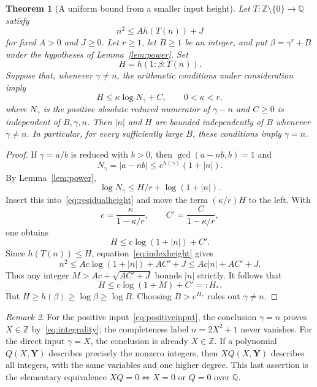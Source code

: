 \documentclass[11pt,a4paper]{article}
\newtheorem{theorem}{Theorem}[section]
\theoremstyle{remark}\newtheorem{remark}[theorem]{Remark}
\newcommand{\Q}{\mathbb Q}\newcommand{\Z}{\mathbb Z}
\begin{document}
\begin{theorem}[A uniform bound from a smaller input height]
\label{thm:absorption}
Let $T:\Z\setminus\{0\}\to\Q$ satisfy
\begin{equation}\label{eq:indexheight}
                  n^2\le A h(T(n))+J
\end{equation}
for fixed $A>0$ and $J\ge0$. Let $r\ge1$, let $B\ge1$ be
an integer, and put $\beta=\gamma^r+B$ under the hypotheses
of Lemma~\ref{lem:power}. Set
\[
                      H=h(1:\beta:T(n)).
\]
Suppose that, whenever $\gamma\ne n$, the arithmetic conditions
under consideration imply
\begin{equation}\label{eq:residualheight}
               H\le\kappa\log N_\gamma+C,
               \qquad 0<\kappa<r,
\end{equation}
where $N_\gamma$ is the positive absolute reduced numerator of
$\gamma-n$ and $C\ge0$ is independent of $B,\gamma,n$.
Then $|n|$ and $H$ are bounded independently of $B$ whenever
$\gamma\ne n$. In particular, for every sufficiently large $B$,
these conditions imply $\gamma=n$.
\end{theorem}
\begin{proof}
If $\gamma=a/b$ is reduced with $b>0$, then
$\gcd(a-nb,b)=1$ and
\[
 N_\gamma=|a-nb|\le e^{h(\gamma)}(1+|n|).
\]
By Lemma~\ref{lem:power},
\[
                  \log N_\gamma\le H/r+\log(1+|n|).
\]
Insert this into~\eqref{eq:residualheight} and move the term
$(\kappa/r)H$ to the left. With
\[
 c=\frac{\kappa}{1-\kappa/r},\qquad
 C'=\frac{C}{1-\kappa/r},
\]
one obtains
\begin{equation}\label{eq:absorbed}
                         H\le c\log(1+|n|)+C'.
\end{equation}
Since $h(T(n))\le H$, equation~\eqref{eq:indexheight} gives
\[
 n^2\le Ac\log(1+|n|)+AC'+J\le Ac|n|+AC'+J.
\]
Thus any integer $M>Ac+\sqrt{AC'+J}$ bounds $|n|$ strictly.
It follows that
\[
 H\le c\log(1+M)+C'=:H_*.
\]
But $H\ge h(\beta)\ge\log\beta\ge\log B$.
Choosing $B>e^{H_*}$ rules out $\gamma\ne n$.
\end{proof}

\begin{remark}
For the positive input~\eqref{eq:positiveinput}, the conclusion
$\gamma=n$ proves $X\in\Z$ by~\eqref{eq:integrality}; the
completeness label $n=2X^2+1$ never vanishes. For the direct
input $\gamma=X$, the conclusion is already $X\in\Z$.
If a polynomial $Q(X,\boldsymbol Y)$ describes precisely the
nonzero integers, then $XQ(X,\boldsymbol Y)$ describes all
integers, with the same variables and one higher degree.
This last assertion is the elementary equivalence
$XQ=0\Longleftrightarrow X=0\text{ or }Q=0$ over $\Q$.
\end{remark}
\end{document}
